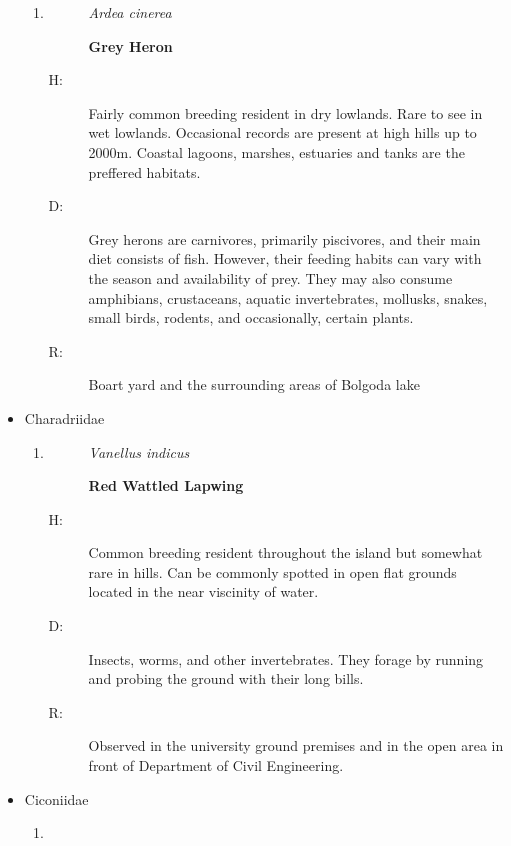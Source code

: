 \begin{itemize}
\begin{enumerate}
\item%
\begin{description}%
\item[]%
\textit{Ardea cinerea}%
\item[]%
\textbf{Grey Heron}%
\end{description}%
\begin{description}%
\item[H: ]%
Fairly common breeding resident in dry lowlands. Rare to see in wet lowlands. Occasional records are present at high hills up to 2000m. Coastal lagoons, marshes, estuaries and tanks are the preffered habitats.%
\item[D: ]%
Grey herons are carnivores, primarily piscivores, and their main diet consists of fish. However, their feeding habits can vary with the season and availability of prey. They may also consume amphibians, crustaceans, aquatic invertebrates, mollusks, snakes, small birds, rodents, and occasionally, certain plants.%
\item[R: ]%
Boart yard and the surrounding areas of Bolgoda lake%
\end{description}%
\end{enumerate}%
\item%
Charadriidae%
\begin{enumerate}%
\item%
\begin{description}%
\item[]%
\textit{Vanellus indicus}%
\item[]%
\textbf{Red Wattled Lapwing}%
\end{description}%
\begin{description}%
\item[H: ]%
Common breeding resident throughout the island but somewhat rare in hills. Can be commonly spotted in open flat grounds located in the near viscinity of water.%
\item[D: ]%
Insects, worms, and other invertebrates. They forage by running and probing the ground with their long bills.%
\item[R: ]%
Observed in the university ground premises and in the open area in front of Department of Civil Engineering.%
\end{description}%
\end{enumerate}%
\item%
Ciconiidae%
\begin{enumerate}%
\item%
\begin{description}%

\end{description}
\end{enumerate}
\end{itemize}
